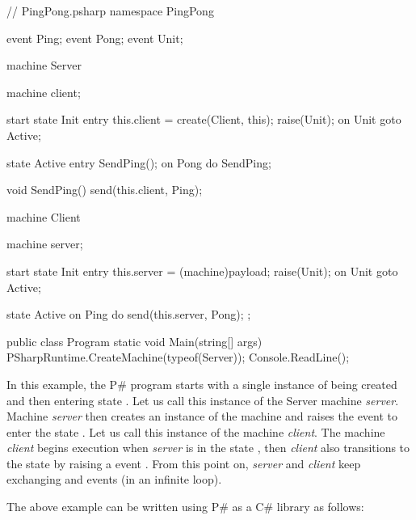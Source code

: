 \documentclass{llncs}
\newcommand{\ps}{P\#\xspace}
\newcommand{\cs}{C\#\xspace}
\begin{document}
\begin{psharp}[caption=Simple PingPong application written in the \ps high-level syntax., label=fig:simple_example_ps]
// PingPong.psharp
namespace PingPong {
  event Ping;
  event Pong;
  event Unit;
  
  machine Server {
    machine client;

    start state Init {
      entry {
        this.client = create(Client, this);
        raise(Unit);
      }
      on Unit goto Active;
    }

    state Active {
      entry {
        SendPing();
      }
      on Pong do SendPing;
    }

    void SendPing() {
      send(this.client, Ping);
    }
  }

  machine Client {
    machine server;

    start state Init {
      entry {
        this.server = (machine)payload;
        raise(Unit);
      }
      on Unit goto Active;
    }

    state Active {
      on Ping do {
        send(this.server, Pong);
      };
    }
  }
  
  public class Program {
    static void Main(string[] args) {
      PSharpRuntime.CreateMachine(typeof(Server));
      Console.ReadLine();
    }
  }
}
\end{psharp}

In this example, the \ps program starts with a single instance of  being created and then entering state . Let us call this instance of the Server machine \emph{server}. Machine \emph{server} then creates an instance of the  machine and raises the event  to enter the state . Let us call this instance of the  machine \emph{client}. The machine \emph{client} begins execution when \emph{server} is in the state , then \emph{client} also transitions to the state  by raising a event . From this point on, \emph{server} and \emph{client} keep exchanging  and  events (in an infinite loop).

The above example can be written using \ps as a \cs library as follows:
\end{document}
